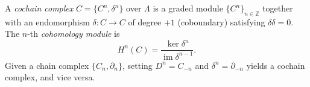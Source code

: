 A \emph{cochain complex} $C = \{C^n, \delta^n\}$ over $\Lambda$ is a graded module $\{C^n\}_{n \in \mathbb{Z}}$ together with an endomorphism $\delta : C \to C$ of degree $+1$ (coboundary) satisfying $\delta \delta = 0$. The $n$-th \emph{cohomology module} is
$$H^n(C) = \frac{\ker \delta^n}{\operatorname{im} \delta^{n-1}}.$$
Given a chain complex $\{C_n, \partial_n\}$, setting $D^n = C_{-n}$ and $\delta^n = \partial_{-n}$ yields a cochain complex, and vice versa.